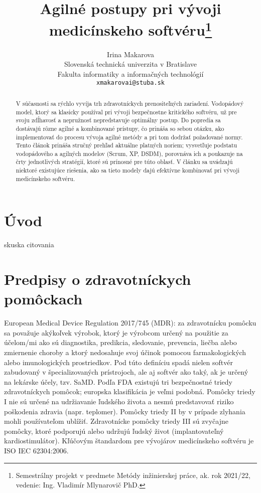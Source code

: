 \documentclass[10pt,twoside,slovak,a4paper,oneside]{article}
\title{Agilné postupy pri vývoji medicínskeho softvéru\thanks{Semestrálny projekt v predmete Metódy inžinierskej práce, ak. rok 2021/22, vedenie: Ing. Vladimír Mlynarovič PhD.}}
\author{Irina Makarova\\[2pt]
	{\small Slovenská technická univerzita v Bratislave}\\
	{\small Fakulta informatiky a informačných technológií}\\
	{\small \texttt{xmakarovai@stuba.sk}}
	}
\begin{document}
\renewcommand{\abstractname}{\vspace{-\baselineskip}} %
\maketitle

\begin{abstract}
V súčasnosti sa rýchlo vyvíja trh zdravotníckych prenositeľných zariadení. Vodopádový model, ktorý sa klasicky používal pri vývoji bezpečnostne kritického softvéru, už pre svoju zdĺhavosť a nepružnosť nepredstavuje optimálny postup. Do popredia sa dostávajú rôzne agilné a kombinované prístupy, čo prináša so sebou otázku, ako implementovať do procesu vývoja agilné metódy a pri tom dodržať požadované normy. Tento článok prináša stručný prehľad aktuálne platných noriem; vysvetľuje podstatu vodopádového a agilných modelov (Scrum, XP, DSDM), porovnáva ich a poukazuje na črty jednotlivých stratégií, ktoré sú prínosné pre túto oblasť. V článku sa uvádzajú niektoré existujúce riešenia, ako sa tieto modely dajú efektívne kombinovať pri vývoji medicínskeho softvéru.
\end{abstract}

\section{Úvod} 


skuska citovania\cite{mccaffery2019}

\section{Predpisy o zdravotníckych pomôckach}
European Medical Device Regulation 2017/745 (MDR): za zdravotnícku pomôcku sa považuje akýkoľvek výrobok, ktorý je výrobcom určený na použitie za účelom/mi ako sú diagnostika, predikcia, sledovanie, prevencia, liečba alebo zmiernenie choroby a ktorý nedosahuje svoj účinok pomocou farmakologických alebo imunologických prostriedkov. Pod túto definíciu spadá nielen softvér zabudovaný v špecializovaných prístrojoch, ale aj softvér ako taký, ak je určený na lekárske účely, tzv. SaMD. Podľa FDA existujú tri bezpečnostné triedy zdravotníckych pomôcok; europska klasifikácia je veľmi podobná. Pomôcky triedy I nie sú určené na udržiavanie ľudského života a nesmú predstavovať riziko poškodenia zdravia (napr. teplomer). Pomôcky triedy II by v prípade zlyhania mohli používateľom ublížiť. Zdravotnícke pomôcky triedy III sú zvyčajne pomôcky, ktoré podporujú alebo udržujú ľudský život (implantovateľný kardiostimulátor).
Kľúčovým štandardom pre vývojárov medicínskeho softvéru je ISO IEC 62304:2006.
\end{document}
